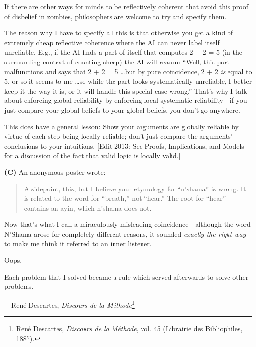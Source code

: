 {
 If there are other ways for minds to be reflectively coherent that
avoid this proof of disbelief in zombies, philosophers are welcome to
try and specify them.}

{
 The reason why I have to specify all this is that otherwise you
get a kind of extremely cheap reflective coherence where the AI can
never label itself unreliable. E.g., if the AI finds a part of itself
that computes 2 + 2 = 5 (in the surrounding context of counting sheep)
the AI will reason: ``Well, this part malfunctions and
says that 2 + 2 = 5 \ldots but by pure coincidence, 2 + 2 \textit{is}
equal to 5, or so it seems to me \ldots so while the part looks
systematically unreliable, I better keep it the way it is, or it will
handle this special case wrong.''
That's why I talk about enforcing global reliability by
enforcing local systematic reliability---if you just compare your
global beliefs to your global beliefs, you don't go
anywhere.}

{
 This does have a general lesson: Show your arguments are globally
reliable by virtue of each step being locally reliable;
don't just compare the arguments'
conclusions to your intuitions. [Edit 2013: See Proofs, Implications,
and Models for a discussion of the fact that valid logic is locally
valid.]}

{
 \textbf{(C)} An anonymous poster wrote:}

\begin{quotation}

{
 A sidepoint, this, but I believe your etymology for
``n'shama'' is
wrong. It is related to the word for
``breath,'' not
``hear.'' The root for
``hear'' contains an ayin, which
n'shama does not.}
\end{quotation}

{
 Now that's what I call a miraculously misleading
coincidence---although the word N'Shama arose for
completely different reasons, it sounded \textit{exactly the right way}
to make me think it referred to an inner listener.}

{
 Oops.}

\myendsectiontext


{
 Each problem that I solved became a rule which served afterwards
to solve other problems.}

{\raggedleft
 {}---René Descartes, \textit{Discours de la
Méthode}\footnote{René Descartes, \textit{Discours de la Méthode}, vol. 45
(Librairie des Bibliophiles, 1887).}
\par}


